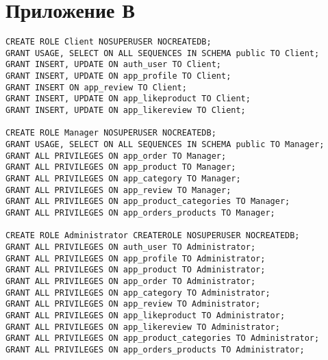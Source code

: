 \newpage

\chapter*{Приложение В}

\captionsetup{singlelinecheck = false, justification=raggedright}
\begin{lstlisting}[label=roles,caption=Роли на уровне БД]
CREATE ROLE Client NOSUPERUSER NOCREATEDB;
GRANT USAGE, SELECT ON ALL SEQUENCES IN SCHEMA public TO Client;
GRANT INSERT, UPDATE ON auth_user TO Client;
GRANT INSERT, UPDATE ON app_profile TO Client;
GRANT INSERT ON app_review TO Client;
GRANT INSERT, UPDATE ON app_likeproduct TO Client;
GRANT INSERT, UPDATE ON app_likereview TO Client;

CREATE ROLE Manager NOSUPERUSER NOCREATEDB;
GRANT USAGE, SELECT ON ALL SEQUENCES IN SCHEMA public TO Manager;
GRANT ALL PRIVILEGES ON app_order TO Manager;
GRANT ALL PRIVILEGES ON app_product TO Manager;
GRANT ALL PRIVILEGES ON app_category TO Manager;
GRANT ALL PRIVILEGES ON app_review TO Manager;
GRANT ALL PRIVILEGES ON app_product_categories TO Manager;
GRANT ALL PRIVILEGES ON app_orders_products TO Manager;

CREATE ROLE Administrator CREATEROLE NOSUPERUSER NOCREATEDB;
GRANT ALL PRIVILEGES ON auth_user TO Administrator;
GRANT ALL PRIVILEGES ON app_profile TO Administrator;
GRANT ALL PRIVILEGES ON app_product TO Administrator;
GRANT ALL PRIVILEGES ON app_order TO Administrator;
GRANT ALL PRIVILEGES ON app_category TO Administrator;
GRANT ALL PRIVILEGES ON app_review TO Administrator;
GRANT ALL PRIVILEGES ON app_likeproduct TO Administrator;
GRANT ALL PRIVILEGES ON app_likereview TO Administrator;
GRANT ALL PRIVILEGES ON app_product_categories TO Administrator;
GRANT ALL PRIVILEGES ON app_orders_products TO Administrator;
\end{lstlisting}